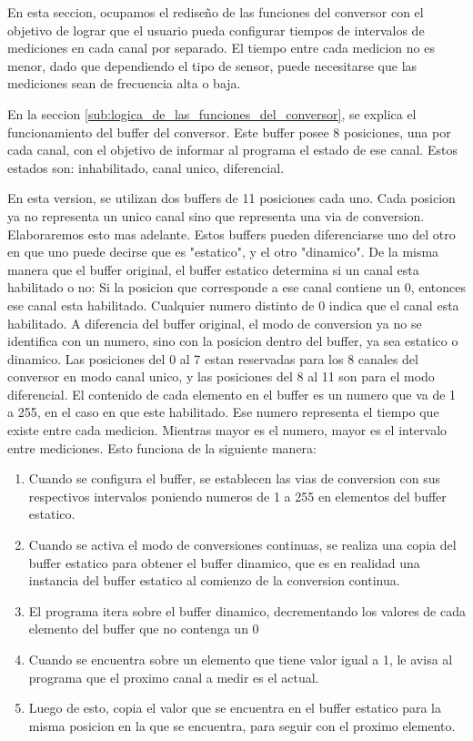 En esta seccion, ocupamos el rediseño de las funciones del conversor con el objetivo de lograr que el usuario pueda configurar tiempos de intervalos de mediciones en cada canal por separado. El tiempo entre cada medicion no es menor, dado que dependiendo el tipo de sensor, puede necesitarse que las mediciones sean de frecuencia alta o baja.

En la seccion \ref{sub:logica_de_las_funciones_del_conversor}, se explica el funcionamiento del buffer del conversor. Este buffer posee 8 posiciones, una por cada canal, con el objetivo de informar al programa el estado de ese canal. Estos estados son: inhabilitado, canal unico, diferencial.

En esta version, se utilizan dos buffers de 11 posiciones cada uno. Cada posicion ya no representa un unico canal sino que representa una via de conversion. Elaboraremos esto mas adelante. Estos buffers pueden diferenciarse uno del otro en que uno puede decirse que es "estatico", y el otro "dinamico". De la misma manera que el buffer original, el buffer estatico determina si un canal esta habilitado o no: Si la posicion que corresponde a ese canal contiene un 0, entonces ese canal esta habilitado. Cualquier numero distinto de 0 indica que el canal esta habilitado. A diferencia del buffer original, el modo de conversion ya no se identifica con un numero, sino con la posicion dentro del buffer, ya sea estatico o dinamico. Las posiciones del 0 al 7 estan reservadas para los 8 canales del conversor en modo canal unico, y las posiciones del 8 al 11 son para el modo diferencial. 
El contenido de cada elemento en el buffer es un numero que va de 1 a 255, en el caso en que este habilitado. Ese numero representa el tiempo que existe entre cada medicion. Mientras mayor es el numero, mayor es el intervalo entre mediciones. Esto funciona de la siguiente manera:

\begin{enumerate}
\item Cuando se configura el buffer, se establecen las vias de conversion con sus respectivos intervalos poniendo numeros de 1 a 255 en elementos del buffer estatico.
\item Cuando se activa el modo de conversiones continuas, se realiza una copia del buffer estatico para obtener el buffer dinamico, que es en realidad una instancia del buffer estatico al comienzo de la conversion continua.
\item El programa itera sobre el buffer dinamico, decrementando los valores de cada elemento del buffer que no contenga un 0
\item Cuando se encuentra sobre un elemento que tiene valor igual a 1, le avisa al programa que el proximo canal a medir es el actual.
\item Luego de esto, copia el valor que se encuentra en el buffer estatico para la misma posicion en la que se encuentra, para seguir con el proximo elemento.
\end{enumerate}


